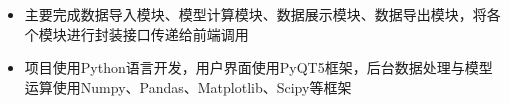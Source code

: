 \documentclass{resume}
\begin{document}
\begin{onehalfspacing}
\begin{itemize}
  \item 主要完成数据导入模块、模型计算模块、数据展示模块、数据导出模块，将各个模块进行封装接口传递给前端调用
  \item 项目使用Python语言开发，用户界面使用PyQT5框架，后台数据处理与模型运算使用Numpy、Pandas、Matplotlib、Scipy等框架
\end{itemize}
\end{onehalfspacing}



\end{document}
